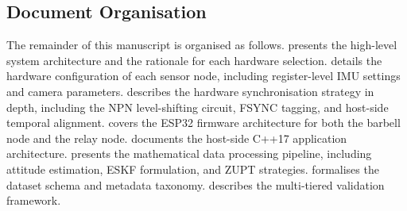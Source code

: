 \subsection{Document Organisation}

The remainder of this manuscript is organised as follows.
 presents the high-level system architecture and the rationale for each hardware selection.
 details the hardware configuration of each sensor node, including register-level IMU settings and camera parameters.
 describes the hardware synchronisation strategy in depth, including the NPN level-shifting circuit, FSYNC tagging, and host-side temporal alignment.
 covers the ESP32 firmware architecture for both the barbell node and the relay node.
 documents the host-side C++17 application architecture.
 presents the mathematical data processing pipeline, including attitude estimation, ESKF formulation, and ZUPT strategies.
 formalises the dataset schema and metadata taxonomy.
 describes the multi-tiered validation framework.
